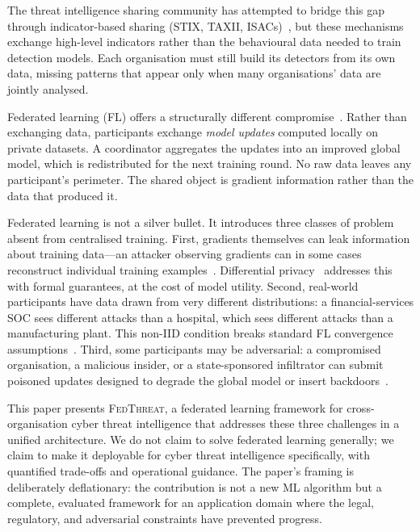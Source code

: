 \documentclass[sigconf,nonacm]{acmart}
\begin{document}
The threat intelligence sharing community has attempted to bridge this gap
through indicator-based sharing (STIX, TAXII, ISACs)~\cite{stix2x}, but
these mechanisms exchange high-level indicators rather than the
behavioural data needed to train detection models. Each organisation must
still build its detectors from its own data, missing patterns that appear
only when many organisations' data are jointly analysed.

Federated learning (FL) offers a structurally different
compromise~\cite{mcmahan2017fedavg,kairouz2021advances}. Rather than
exchanging data, participants exchange \emph{model updates} computed
locally on private datasets. A coordinator aggregates the updates into an
improved global model, which is redistributed for the next training round.
No raw data leaves any participant's perimeter. The shared object is
gradient information rather than the data that produced it.

Federated learning is not a silver bullet. It introduces three classes of
problem absent from centralised training. First, gradients themselves can
leak information about training data---an attacker observing gradients can
in some cases reconstruct individual training examples~\cite{zhu2019dlg}.
Differential privacy~\cite{dwork2014algorithmic} addresses this with formal
guarantees, at the cost of model utility. Second, real-world participants
have data drawn from very different distributions: a financial-services SOC
sees different attacks than a hospital, which sees different attacks than a
manufacturing plant. This non-IID condition breaks standard FL convergence
assumptions~\cite{li2020fedprox,zhao2018noniid}. Third, some participants
may be adversarial: a compromised organisation, a malicious insider, or a
state-sponsored infiltrator can submit poisoned updates designed to
degrade the global model or insert
backdoors~\cite{bagdasaryan2020backdoor,bhagoji2019analyzing}.

This paper presents \textsc{FedThreat}, a federated learning framework for
cross-organisation cyber threat intelligence that addresses these three
challenges in a unified architecture. We do not claim to solve federated
learning generally; we claim to make it deployable for cyber threat
intelligence specifically, with quantified trade-offs and operational
guidance. The paper's framing is deliberately deflationary: the
contribution is not a new ML algorithm but a complete, evaluated framework
for an application domain where the legal, regulatory, and adversarial
constraints have prevented progress.
\end{document}
